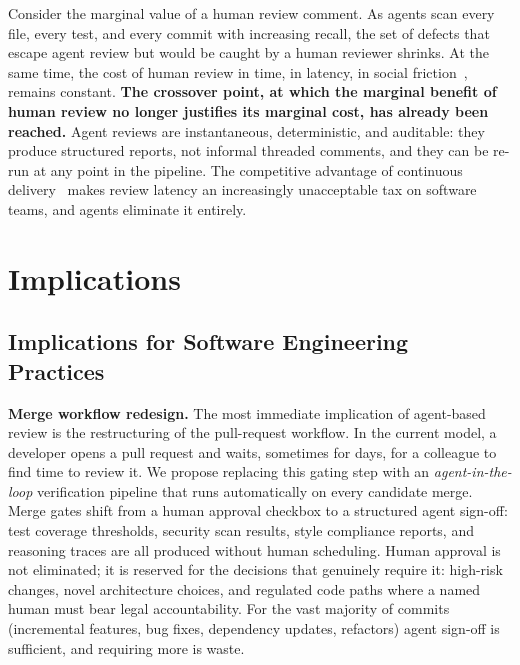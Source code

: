 \documentclass[10pt,conference]{IEEEtran}
\begin{document}
Consider the marginal value of a human review comment.
As agents scan every file, every test, and every commit with increasing recall, the set of defects that escape agent review but would be caught by a human reviewer shrinks.
At the same time, the cost of human review in time, in latency, in social friction~\cite{bosu2016process,murgia2014developers}, remains constant.
\textbf{The crossover point, at which the marginal benefit of human review no longer justifies its marginal cost, has already been reached.}
Agent reviews are instantaneous, deterministic, and auditable: they produce structured reports, not informal threaded comments, and they can be re-run at any point in the pipeline.
The competitive advantage of continuous delivery~\cite{shahin2017continuous} makes review latency an increasingly unacceptable tax on software teams, and agents eliminate it entirely.

\section{Implications}
\label{sec:implications}
\subsection{Implications for Software Engineering Practices}
\label{sec:practices}

\textbf{Merge workflow redesign.}
The most immediate implication of agent-based review is the restructuring of the pull-request workflow.
In the current model, a developer opens a pull request and waits, sometimes for days, for a colleague to find time to review it.
We propose replacing this gating step with an \emph{agent-in-the-loop} verification pipeline that runs automatically on every candidate merge.
Merge gates shift from a human approval checkbox to a structured agent sign-off: test coverage thresholds, security scan results, style compliance reports, and reasoning traces are all produced without human scheduling.
Human approval is not eliminated; it is reserved for the decisions that genuinely require it: high-risk changes, novel architecture choices, and regulated code paths where a named human must bear legal accountability.
For the vast majority of commits (incremental features, bug fixes, dependency updates, refactors) agent sign-off is sufficient, and requiring more is waste.
\end{document}
